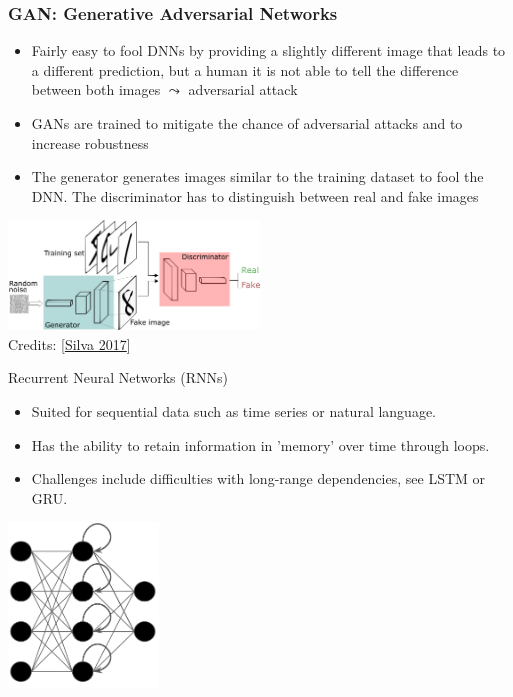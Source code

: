 \documentclass[aspectratio=169]{../latex_main/tntbeamer}  %
\begin{document}
        \begin{frame}
        \frametitle{GAN: Generative Adversarial Networks}
        \begin{itemize}
            \item Fairly easy to fool DNNs by providing a slightly different image that leads to a different prediction, but a human it is not able to tell the difference between both images $\leadsto$ adversarial attack
            \item GANs are trained to mitigate the chance of adversarial attacks and to increase robustness 
            \item The generator generates images similar to the training dataset to fool the DNN. The discriminator has to distinguish between real and fake images
        \end{itemize}
        \centering
        \includegraphics[width=0.5\textwidth]{figure/gans.png}\\
        Credits: [\href{https://sthalles.github.io/intro-to-gans/}{Silva 2017}]
        \end{frame}

        \begin{frame}{Recurrent Neural Networks (RNNs)}
        \begin{itemize}
            \item Suited for sequential data such as time series or natural language.
            \item Has the ability to retain information in 'memory' over time through loops.
            \item Challenges include difficulties with long-range dependencies, see LSTM or GRU.
        \end{itemize}
        \centering
        \includegraphics[width=0.3\textwidth]{figure/rnn.png}
        \end{frame}
\end{document}
